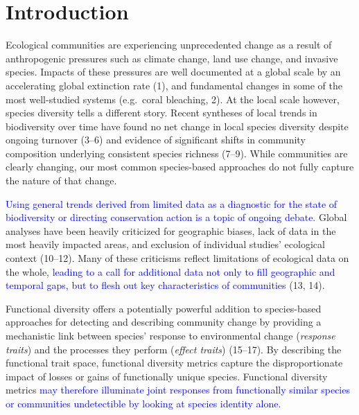 \documentclass{article}
\begin{document}

\hypertarget{introduction}{%
\section{Introduction}\label{introduction}}

Ecological communities are experiencing unprecedented change as a result
of anthropogenic pressures such as climate change, land use change, and
invasive species. Impacts of these pressures are well documented at a
global scale by an accelerating global extinction rate (1), and
fundamental changes in some of the most well-studied systems (e.g.~coral
bleaching, 2). At the local scale however, species diversity tells a
different story. Recent syntheses of local trends in biodiversity over
time have found no net change in local species diversity despite ongoing
turnover (3--6) and evidence of significant shifts in community
composition underlying consistent species richness (7--9). While
communities are clearly changing, our most common species-based
approaches do not fully capture the nature of that change.

\textcolor{blue}{Using general trends derived from limited data as a diagnostic for the state of biodiversity or directing conservation action is a topic of ongoing debate.}
Global analyses have been heavily criticized for geographic biases, lack
of data in the most heavily impacted areas, and exclusion of individual
studies' ecological context (10--12). Many of these criticisms reflect
limitations of ecological data on the whole,
\textcolor{blue}{leading to a call for additional data not only to fill geographic and temporal gaps, but to flesh out key characteristics of communities}
(13, 14).

Functional diversity offers a potentially powerful addition to
species-based approaches for detecting and describing community change
by providing a mechanistic link between species' response to
environmental change (\emph{response traits}) and the processes they
perform (\emph{effect traits}) (15--17). By describing the functional
trait space, functional diversity metrics capture the disproportionate
impact of losses or gains of functionally unique species. Functional
diversity metrics
\textcolor{blue}{may therefore illuminate joint responses from functionally similar species or communities undetectible by looking at species identity alone.}
\end{document}

